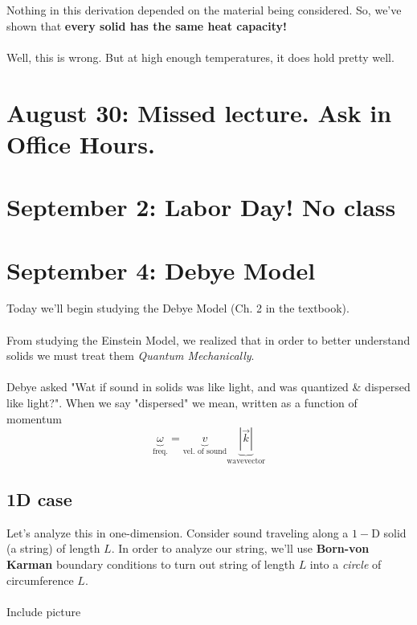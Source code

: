 \documentclass[11pt]{article}
\begin{document}
\begin{bluebox}
  Nothing in this derivation depended on the material being considered. So, we've shown that \textbf{every solid has the same heat capacity!}
  \\
  \\
  Well, this is wrong. But at high enough temperatures, it does hold pretty well. 
\end{bluebox}


\pagebreak
\section{August 30: Missed lecture. Ask in Office Hours.}



\pagebreak
\section{September 2: Labor Day! No class}


\pagebreak
\section{September 4: Debye Model}

Today we'll begin studying the Debye Model (Ch. 2 in the textbook). 
\\
\\
From studying the Einstein Model, we realized that in order to better understand solids we must treat them \textit{Quantum Mechanically}.
\\
\\
Debye asked "Wat if sound in solids was like light, and was quantized \& dispersed like light?". When we say "dispersed" we mean, written as a function of momentum
\[ \underbrace{\omega}_{\text{freq.}} = \underbrace{v}_{\text{vel. of sound}} \underbrace{|\vec{k}|}_{\text{wavevector}} \] 


\subsection{1D case}
Let's analyze this in one-dimension. Consider sound traveling along a $1-$D solid (a string) of length $L$. In order to analyze our string, we'll use \textbf{Born-von Karman} boundary conditions to turn out string of length $L$ into a \emph{circle} of circumference $L$.
\\
\\
Include picture
\\
\end{document}

